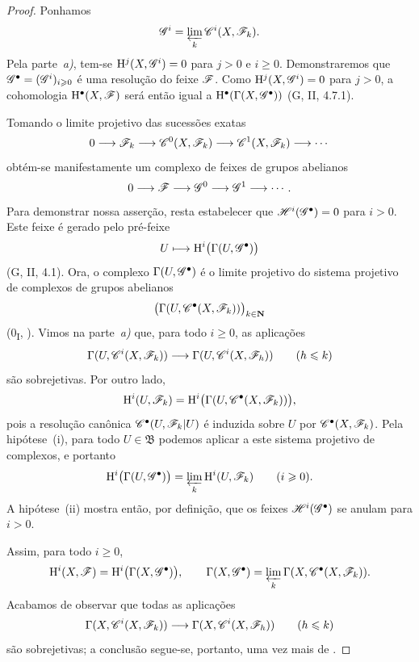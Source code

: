 \begin{proof}
Ponhamos
\[
  \mathscr{G}^i=\varprojlim_k\mathscr{C}^i(X,\mathscr{F}_k).
\]
Pela parte~\emph{a)}, tem-se
$\mathrm{H}^j(X,\mathscr{G}^i)=0$ para $j>0$ e $i\geq0$.
Demonstraremos que
$\mathscr{G}^\bullet=(\mathscr{G}^i)_{i\geqslant0}$ é uma resolução do feixe
$\mathscr{F}$. Como $\mathrm{H}^j(X,\mathscr{G}^i)=0$ para $j>0$, a cohomologia
$\mathrm{H}^\bullet(X,\mathscr{F})$ será então igual a
$\mathrm{H}^\bullet(\Gamma(X,\mathscr{G}^\bullet))$ (G, II, 4.7.1).

Tomando o limite projetivo das sucessões exatas
\[
  0\longrightarrow\mathscr{F}_k
  \longrightarrow\mathscr{C}^0(X,\mathscr{F}_k)
  \longrightarrow\mathscr{C}^1(X,\mathscr{F}_k)
  \longrightarrow\cdots
\]
obtém-se manifestamente um complexo de feixes de grupos abelianos
\[
  0\longrightarrow\mathscr{F}
  \longrightarrow\mathscr{G}^0
  \longrightarrow\mathscr{G}^1
  \longrightarrow\cdots.
\]
Para demonstrar nossa asserção, resta estabelecer que
$\mathscr{H}^i(\mathscr{G}^\bullet)=0$ para $i>0$.
Este feixe é gerado pelo pré-feixe
\[
  U\longmapsto\mathrm{H}^i\bigl(\Gamma(U,\mathscr{G}^\bullet)\bigr)
\]
(G, II, 4.1).
Ora, o complexo $\Gamma(U,\mathscr{G}^\bullet)$ é o limite projetivo
do sistema projetivo de complexos de grupos abelianos
\[
  \bigl(\Gamma(U,\mathscr{C}^\bullet(X,\mathscr{F}_k))\bigr)_{k\in\mathbf{N}}
\]
(0\textsubscript{I}, ).
Vimos na parte~\emph{a)} que, para todo $i\geq0$, as aplicações
\[
  \Gamma(U,\mathscr{C}^i(X,\mathscr{F}_k))
  \longrightarrow
  \Gamma(U,\mathscr{C}^i(X,\mathscr{F}_h))
  \qquad(h\leqslant k)
\]
são sobrejetivas. Por outro lado,
\[
  \mathrm{H}^i(U,\mathscr{F}_k)
  =
  \mathrm{H}^i\bigl(\Gamma(U,\mathscr{C}^\bullet(X,\mathscr{F}_k))\bigr),
\]
pois a resolução canônica $\mathscr{C}^\bullet(U,\mathscr{F}_k|U)$ é
induzida sobre $U$ por $\mathscr{C}^\bullet(X,\mathscr{F}_k)$.
Pela hipótese~{\rm(i)}, para todo $U\in\mathfrak{B}$ podemos aplicar
 a este sistema projetivo de complexos, e portanto
\[
  \mathrm{H}^i\bigl(\Gamma(U,\mathscr{G}^\bullet)\bigr)
  =
  \varprojlim_k\mathrm{H}^i(U,\mathscr{F}_k)
  \qquad(i\geqslant0).
\]
A hipótese~{\rm(ii)} mostra então, por definição, que os feixes
$\mathscr{H}^i(\mathscr{G}^\bullet)$ se anulam para $i>0$.

Assim, para todo $i\geq0$,
\[
  \mathrm{H}^i(X,\mathscr{F})
  =
  \mathrm{H}^i\bigl(\Gamma(X,\mathscr{G}^\bullet)\bigr),
  \qquad
  \Gamma(X,\mathscr{G}^\bullet)
  =
  \varprojlim_k\Gamma(X,\mathscr{C}^\bullet(X,\mathscr{F}_k)).
\]
Acabamos de observar que todas as aplicações
\[
  \Gamma(X,\mathscr{C}^i(X,\mathscr{F}_k))
  \longrightarrow
  \Gamma(X,\mathscr{C}^i(X,\mathscr{F}_h))
  \qquad(h\leqslant k)
\]
são sobrejetivas; a conclusão segue-se, portanto, uma vez mais de
.
\end{proof}

